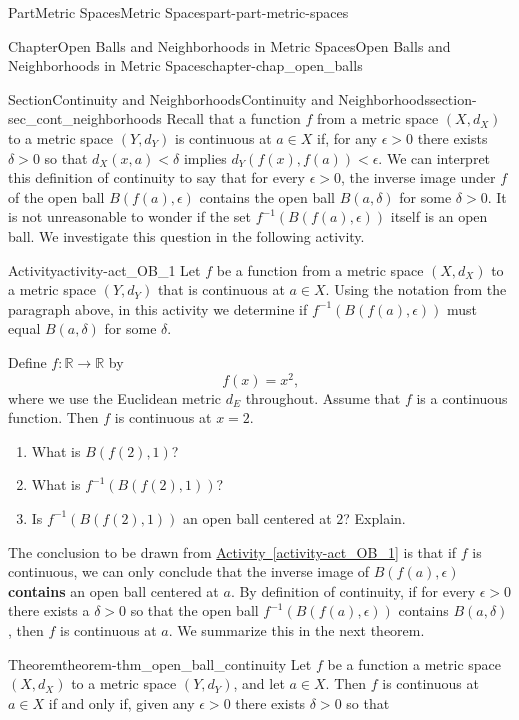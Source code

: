 \documentclass[oneside,10pt,]{book}
\newcommand{\xreffont}{\relax}
\newcommand{\terminology}[1]{\textbf{#1}}
\numberwithin{equation}{chapter}
\newcommand{\R}{\mathbb{R}}
\newcommand{\lt}{<}
\newcommand{\gt}{>}
\begin{document}
\begin{partptx}{Part}{Metric Spaces}{}{Metric Spaces}{}{}{part-part-metric-spaces}
\begin{chapterptx}{Chapter}{Open Balls and Neighborhoods in Metric Spaces}{}{Open Balls and Neighborhoods in Metric Spaces}{}{}{chapter-chap_open_balls}
\begin{sectionptx}{Section}{Continuity and Neighborhoods}{}{Continuity and Neighborhoods}{}{}{section-sec_cont_neighborhoods}
Recall that a function \(f\) from a metric space \((X, d_X)\) to a metric space \((Y, d_Y)\) is continuous at \(a \in X\) if, for any \(\epsilon \gt 0\) there exists \(\delta \gt 0\) so that \(d_X(x,a) \lt \delta\) implies \(d_Y(f(x),f(a)) \lt \epsilon\). We can interpret this definition of continuity to say that for every \(\epsilon \gt 0\), the inverse image under \(f\) of the open ball \(B(f(a), \epsilon)\) contains the open ball \(B(a, \delta)\) for some \(\delta \gt 0\). It is not unreasonable to wonder if the set \(f^{-1}\left(B(f(a), \epsilon)\right)\) itself is an open ball. We investigate this question in the following activity.%
\begin{activity}{Activity}{}{activity-act_OB_1}%
Let \(f\) be a function from a metric space \((X, d_X)\) to a metric space \((Y, d_Y)\) that is continuous at \(a \in X\). Using the notation from the paragraph above, in this activity we determine if \(f^{-1}\left(B(f(a), \epsilon)\right)\) must equal \(B(a, \delta)\) for some \(\delta\).%
\par
Define \(f : \R \to \R\) by%
\begin{equation*}
f(x) = x^2\text{,}
\end{equation*}
where we use the Euclidean metric \(d_E\) throughout. Assume that \(f\) is a continuous function. Then \(f\) is continuous at \(x=2\).%
\begin{enumerate}[font=\bfseries,label=(\alph*),ref=\alph*]%
\item{}What is \(B(f(2), 1)\)?%
\item{}What is \(f^{-1}\left(B(f(2), 1)\right)\)?%
\item{}Is \(f^{-1}\left(B(f(2), 1)\right)\) an open ball centered at \(2\)? Explain.%
\end{enumerate}%
\end{activity}%
The conclusion to be drawn from \hyperref[activity-act_OB_1]{Activity~{\xreffont\ref{activity-act_OB_1}}} is that if \(f\) is continuous, we can only conclude that the inverse image of \(B(f(a), \epsilon)\) \terminology{contains} an open ball centered at \(a\). By definition of continuity, if for every \(\epsilon \gt 0\) there exists a \(\delta \gt 0\) so that the open ball \(f^{-1}\left(B(f(a), \epsilon)\right)\) contains \(B(a, \delta)\), then \(f\) is continuous at \(a\). We summarize this in the next theorem.%
\begin{theorem}{Theorem}{}{}{theorem-thm_open_ball_continuity}%
Let \(f\) be a function a metric space \((X, d_X)\) to a metric space \((Y, d_Y)\), and let \(a \in X\). Then \(f\) is continuous at \(a \in X\) if and only if, given any \(\epsilon \gt 0\) there exists \(\delta \gt 0\) so that%

\end{theorem}
\end{sectionptx}
\end{chapterptx}
\end{partptx}
\end{document}
